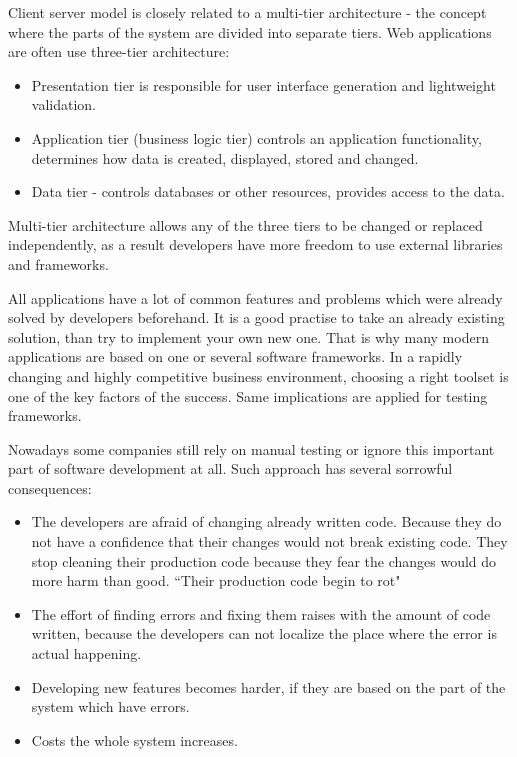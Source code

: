     	Client server model is closely related to a multi-tier architecture - the
    	concept where the parts of the system are divided into separate tiers. Web applications
    	 are often use three-tier architecture:
    	 \begin{itemize}
    	   \item Presentation tier is responsible for user interface generation and
    	   lightweight validation.
    	   \item Application tier (business logic tier) controls an application
    	   functionality, determines how data is created, displayed, stored and
    	   changed.
    	   \item Data tier - controls databases or other resources, provides access
    	   to the data.
    	 \end{itemize}
    	Multi-tier architecture allows any of the three tiers to be changed or
    	replaced independently, as a result developers have more freedom to use
    	external libraries and frameworks.
		
		All	applications have a lot of common features and problems which were already
		solved by developers beforehand. It is a good practise to take an already
		existing solution, than try to implement your own new one. That is why many
		modern applications are based on one or several software frameworks. In a
		rapidly changing and highly competitive business environment, choosing a right toolset is one of
		the key factors of the success.	Same implications are applied for testing frameworks. 	
		
		Nowadays some companies still rely on manual testing or ignore this
		important part of software development at all. Such approach has several
		sorrowful consequences:
		\begin{itemize}
			\item The developers are afraid of changing already written
			code. Because they do not have a confidence that their changes would not 
			break existing code. They stop cleaning their production code because they
			fear the changes would do more harm than good. ``Their production code begin
			to rot"
			\cite[p.123]{cleancode} 
			
			\item The effort of finding errors and	fixing them raises with the amount of
			code written, because the developers can not localize the place where the
			error is actual happening.
			\item Developing new features becomes harder, if they are based on the part
			of the system which have errors.
		
			\item Costs the whole system increases.
	 	 \end{itemize}
	 	 
